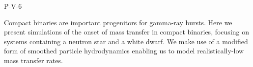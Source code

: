 P-V-6


\bigskip



\bigskip

\noindent Compact binaries are important progenitors for gamma-ray bursts. Here we present simulations of the onset of mass transfer in compact binaries, focusing on systems containing a neutron star and a white dwarf. We make use of a modified form of smoothed particle hydrodynamics enabling us to model realistically-low mass transfer rates.
